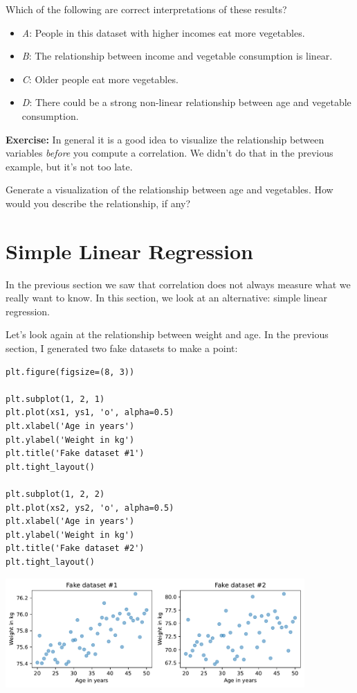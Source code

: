 Which of the following are correct interpretations of these results?

\begin{itemize}

\item
  \emph{A}: People in this dataset with higher incomes eat more
  vegetables.
\item
  \emph{B}: The relationship between income and vegetable consumption is
  linear.
\item
  \emph{C}: Older people eat more vegetables.
\item
  \emph{D}: There could be a strong non-linear relationship between age
  and vegetable consumption.
\end{itemize}

\textbf{Exercise:} In general it is a good idea to visualize the
relationship between variables \emph{before} you compute a correlation.
We didn't do that in the previous example, but it's not too late.

Generate a visualization of the relationship between age and vegetables.
How would you describe the relationship, if any?

\hypertarget{simple-linear-regression}{%
\section{Simple Linear Regression}\label{simple-linear-regression}}

In the previous section we saw that correlation does not always measure
what we really want to know. In this section, we look at an alternative:
simple linear regression.

Let's look again at the relationship between weight and age. In the
previous section, I generated two fake datasets to make a point:

\begin{lstlisting}[]
plt.figure(figsize=(8, 3))

plt.subplot(1, 2, 1)
plt.plot(xs1, ys1, 'o', alpha=0.5)
plt.xlabel('Age in years')
plt.ylabel('Weight in kg')
plt.title('Fake dataset #1')
plt.tight_layout()

plt.subplot(1, 2, 2)
plt.plot(xs2, ys2, 'o', alpha=0.5)
plt.xlabel('Age in years')
plt.ylabel('Weight in kg')
plt.title('Fake dataset #2')
plt.tight_layout()
\end{lstlisting}

\begin{center}
\includegraphics[width=4.5in]{chapters/09_relationships_files/09_relationships_77_0.pdf}
\end{center}

